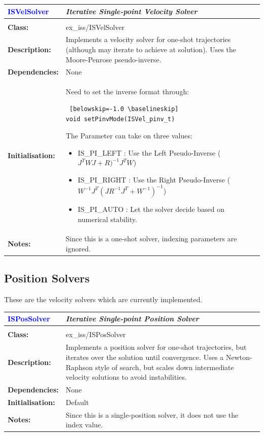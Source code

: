 \documentclass[12pt,a4paper,onecolumn]{article}
\begin{document}
\begin{longtable}{p{3cm}p{10cm}}
\textbf{\textcolor{blue}{ISVelSolver}} & \textit{\textbf{I}terative \textbf{S}ingle-point \textbf{Vel}ocity \textbf{Solver}}\\
\hline \\
\textbf{Class:} & ex\_iss/ISVelSolver \\
\textbf{Description:} & Implements a velocity solver for one-shot trajectories (although may iterate to achieve at solution). Uses the Moore-Penrose pseudo-inverse. \\
\textbf{Dependencies:} &  None \\
\textbf{Initialisation:} & Need to set the inverse format through:
\begin{lstlisting} [belowskip=-1.0 \baselineskip]
void setPinvMode(ISVel_pinv_t)
\end{lstlisting} The Parameter can take on three values:
\begin{itemize} 
\item IS\_PI\_LEFT : Use the Left Pseudo-Inverse ($J^TWJ+R)^{-1}J^TW$)
\item IS\_PI\_RIGHT : Use the Right Pseudo-Inverse ($W^{-1}J^T(JR^{-1}J^T+W^{-1})^{-1}$)
\item IS\_PI\_AUTO : Let the solver decide based on numerical stability.
\end{itemize}\\
\textbf{Notes:} & Since this is a one-shot solver, indexing parameters are ignored.
\end{longtable}

\newpage
\subsection{Position Solvers}
These are the velocity solvers which are currently implemented.\\

\begin{longtable}{p{3cm}p{10cm}}
\textbf{\textcolor{blue}{ISPosSolver}} & \textit{\textbf{I}terative \textbf{S}ingle-point \textbf{Pos}ition \textbf{Solver}}\\
\hline \\
\textbf{Class:} & ex\_iss/ISPosSolver \\
\textbf{Description:} & Implements a position solver for one-shot trajectories, but iterates over the solution until convergence. Uses a Newton-Raphson style of search, but scales down intermediate velocity solutions to avoid instabilities. \\
\textbf{Dependencies:} &  None \\
\textbf{Initialisation:} & Default \\
\textbf{Notes:} & Since this is a single-position solver, it does not use the index value. \\
\end{longtable}
\end{document}
